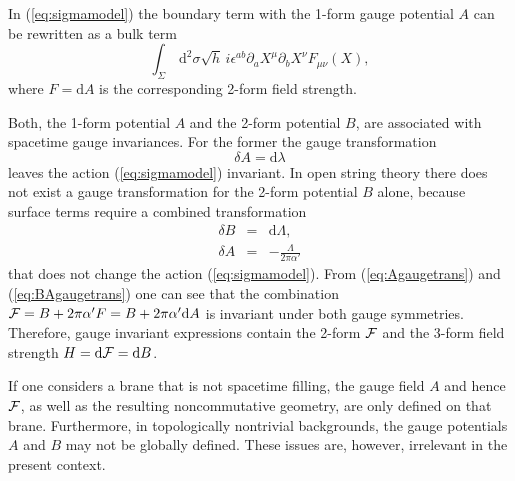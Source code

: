 \documentclass[a4paper,12pt]{article}
\newcommand {\ud} {\mathrm{d}}
\newcommand {\cF} {{\cal F}}
\begin{document}
In (\ref{eq:sigmamodel}) the boundary term with 
the 1-form gauge potential $A$ can be rewritten as a bulk term
\begin{equation}
  \label{eq:fieldstrength}
  \int _\Sigma \,\ud^2\sigma \sqrt{h} \,
        {i \epsilon^{ab} \partial_aX^\mu \partial_bX^\nu F_{\mu\nu}(X)},
\end{equation}
where $F = \ud A$ is the corresponding 2-form field strength.

Both, the 1-form potential $A$ and the 2-form potential $B$, are associated 
with spacetime gauge invariances. For the former the gauge transformation
\begin{equation}
  \label{eq:Agaugetrans}
  \delta A = \ud \lambda
\end{equation}
leaves the action (\ref{eq:sigmamodel}) invariant. In open string
theory there does not exist a gauge transformation for the 2-form 
potential $B$ alone, because surface terms require a combined transformation
\begin{eqnarray}
  \label{eq:BAgaugetrans}
  \delta B &=& \ud \Lambda , \nonumber \\
  \delta A &=& - \frac \Lambda{2\pi\alpha'}
\end{eqnarray}
that does not change the action (\ref{eq:sigmamodel}). 
{}From (\ref{eq:Agaugetrans}) and (\ref{eq:BAgaugetrans}) one can see that 
the combination $\cF = B + 2\pi\alpha' F = B + 2\pi\alpha' \ud A$ is
invariant under both gauge symmetries. Therefore, gauge invariant expressions
contain the 2-form $\cF$ and the 3-form field strength
$H = \ud \cF = \ud B$.

If one considers a brane that is not spacetime 
filling, the gauge field $A$ and hence $\cF$, as well as the resulting
noncommutative geometry, are only defined on that 
brane.
Furthermore, 
in topologically nontrivial backgrounds, the gauge potentials $A$ and $B$ 
may not be globally 
defined. These issues 
are, however, irrelevant in the present context.
\end{document}
